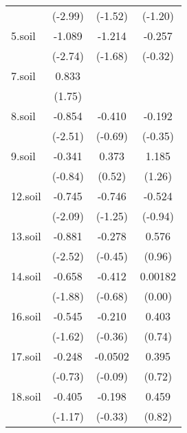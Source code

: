 {\begin{tabular}{l*{3}{c}}
            &     (-2.99)         &     (-1.52)         &     (-1.20)         \\
[1em]
5.soil      &      -1.089\sym{***}&      -1.214\sym{*}  &      -0.257         \\
            &     (-2.74)         &     (-1.68)         &     (-0.32)         \\
[1em]
7.soil      &       0.833\sym{*}  &                     &                     \\
            &      (1.75)         &                     &                     \\
[1em]
8.soil      &      -0.854\sym{**} &      -0.410         &      -0.192         \\
            &     (-2.51)         &     (-0.69)         &     (-0.35)         \\
[1em]
9.soil      &      -0.341         &       0.373         &       1.185         \\
            &     (-0.84)         &      (0.52)         &      (1.26)         \\
[1em]
12.soil     &      -0.745\sym{**} &      -0.746         &      -0.524         \\
            &     (-2.09)         &     (-1.25)         &     (-0.94)         \\
[1em]
13.soil     &      -0.881\sym{**} &      -0.278         &       0.576         \\
            &     (-2.52)         &     (-0.45)         &      (0.96)         \\
[1em]
14.soil     &      -0.658\sym{*}  &      -0.412         &     0.00182         \\
            &     (-1.88)         &     (-0.68)         &      (0.00)         \\
[1em]
16.soil     &      -0.545         &      -0.210         &       0.403         \\
            &     (-1.62)         &     (-0.36)         &      (0.74)         \\
[1em]
17.soil     &      -0.248         &     -0.0502         &       0.395         \\
            &     (-0.73)         &     (-0.09)         &      (0.72)         \\
[1em]
18.soil     &      -0.405         &      -0.198         &       0.459         \\
            &     (-1.17)         &     (-0.33)         &      (0.82)         \\

\end{tabular}}
